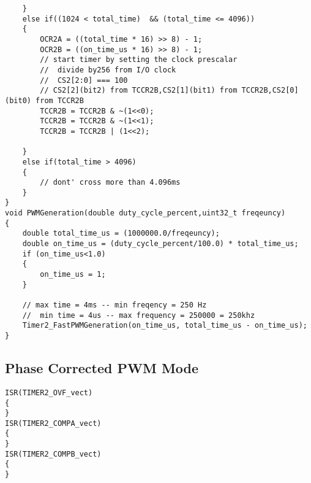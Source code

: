\begin{verbatim}
	}
	else if((1024 < total_time)  && (total_time <= 4096))
	{
		OCR2A = ((total_time * 16) >> 8) - 1;
		OCR2B = ((on_time_us * 16) >> 8) - 1;
		// start timer by setting the clock prescalar
		//  divide by256 from I/O clock
		//  CS2[2:0] === 100
		// CS2[2](bit2) from TCCR2B,CS2[1](bit1) from TCCR2B,CS2[0](bit0) from TCCR2B
		TCCR2B = TCCR2B & ~(1<<0);
		TCCR2B = TCCR2B & ~(1<<1);
		TCCR2B = TCCR2B | (1<<2);
		
	}
	else if(total_time > 4096)
	{
		// dont' cross more than 4.096ms
	}
}
void PWMGeneration(double duty_cycle_percent,uint32_t freqeuncy)
{
	double total_time_us = (1000000.0/freqeuncy);	
	double on_time_us = (duty_cycle_percent/100.0) * total_time_us;
	if (on_time_us<1.0)
	{
		on_time_us = 1;
	}
	
	// max time = 4ms -- min freqency = 250 Hz
	//  min time = 4us -- max frequency = 250000 = 250khz
	Timer2_FastPWMGeneration(on_time_us, total_time_us - on_time_us);
}
\end{verbatim}


\subsection{Phase Corrected PWM Mode}
\begin{verbatim}
ISR(TIMER2_OVF_vect)
{
} 
ISR(TIMER2_COMPA_vect)
{
}
ISR(TIMER2_COMPB_vect)
{
}
\end{verbatim}
